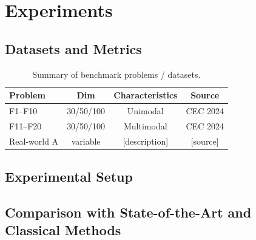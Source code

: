 \documentclass[journal,onecolumn,draftcls]{IEEEtran}
\begin{document}
\section{Experiments}
\label{sec:experiments}

\subsection{Datasets and Metrics}
\label{sec:exp-data}


\begin{table}[t]
  \centering
  \caption{Summary of benchmark problems / datasets.}
  \label{tab:benchmarks}
  \begin{tabular}{lccc}
    \toprule
    \textbf{Problem} & \textbf{Dim} & \textbf{Characteristics} &
    \textbf{Source} \\
    \midrule
    F1--F10 & 30/50/100 & Unimodal & CEC 2024 \cite{ref1} \\
    F11--F20 & 30/50/100 & Multimodal & CEC 2024 \cite{ref1} \\
    Real-world A & variable & [description] & [source] \\
    \bottomrule
  \end{tabular}
\end{table}

\subsection{Experimental Setup}
\label{sec:exp-setup}


\subsection{Comparison with State-of-the-Art and Classical Methods}
\label{sec:exp-main}

\end{document}
